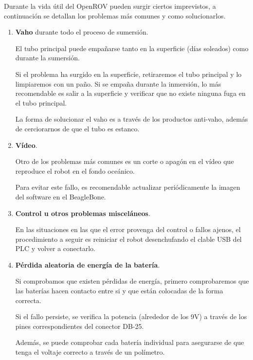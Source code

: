 Durante la vida útil del OpenROV pueden surgir ciertos imprevistos, a continuación se detallan los problemas más comunes y como solucionarlos.
\begin{enumerate}
\item \textbf{Vaho} durante todo el proceso de sumersión.

El tubo principal puede empañarse tanto en la superficie (días soleados) como durante la sumersión.

Si el problema ha surgido en la superficie, retiraremos el tubo principal y lo limpiaremos con un paño. Si se empaña durante la inmersión, lo más recomendable es salir a la superficie y verificar que no existe ninguna fuga en el tubo principal.

La forma de solucionar el vaho es a través de los productos anti-vaho, además de cerciorarnos de que el tubo es estanco.

\item \textbf{Vídeo}.

Otro de los problemas más comunes es un corte o apagón en el vídeo que reproduce el robot en el fondo oceánico. 

Para evitar este fallo, es recomendable actualizar periódicamente la imagen del software en el BeagleBone.

\item \textbf{Control u otros problemas misceláneos}.

En las situaciones en las que el error provenga del control o fallos ajenos, el procedimiento a seguir es reiniciar el robot desenchufando el clable USB del PLC y volver a conectarlo.

\item \textbf{Pérdida aleatoria de energía de la batería}.

Si comprobamos que existen pérdidas de energía, primero comprobaremos que las baterías hacen contacto entre si y que están colocadas de la forma correcta.

Si el fallo persiste, se verifica la potencia (alrededor de los 9V) a través de los pines correspondientes del conector DB-25.

Además, se puede comprobar cada batería individual para asegurarse de que tenga el voltaje correcto a través de un polímetro.


\end{enumerate}
